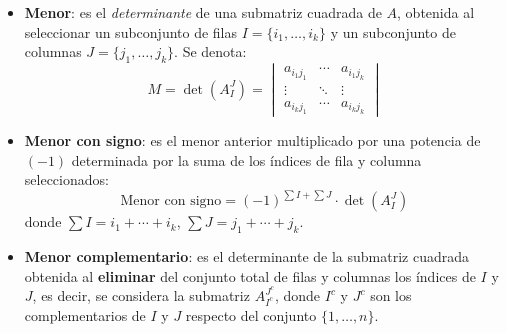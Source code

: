 \begin{itemize}
  \item \textbf{Menor}: es el \textit{determinante} de una submatriz cuadrada de \(A\), obtenida al seleccionar un subconjunto de filas \(I = \{i_1, \ldots, i_k\}\) y un subconjunto de columnas \(J = \{j_1, \ldots, j_k\}\). Se denota:
  \[
  M = \det\left(A^{J}_{I}\right) = 
  \begin{vmatrix}
  a_{i_1 j_1} & \cdots & a_{i_1 j_k} \\
  \vdots & \ddots & \vdots \\
  a_{i_k j_1} & \cdots & a_{i_k j_k}
  \end{vmatrix}
  \]

  \item \textbf{Menor con signo}: es el menor anterior multiplicado por una potencia de \((-1)\) determinada por la suma de los índices de fila y columna seleccionados:
  \[
  \text{Menor con signo} = (-1)^{\sum I + \sum J} \cdot \det\left(A^{J}_{I}\right)
  \]
  donde \(\sum I = i_1 + \cdots + i_k\), \(\sum J = j_1 + \cdots + j_k\).

  \item \textbf{Menor complementario}: es el determinante de la submatriz cuadrada obtenida al \textbf{eliminar} del conjunto total de filas y columnas los índices de \(I\) y \(J\), es decir, se considera la submatriz \(A^{J^c}_{I^c}\), donde \(I^c\) y \(J^c\) son los complementarios de \(I\) y \(J\) respecto del conjunto \(\{1,\ldots,n\}\).
\end{itemize}

